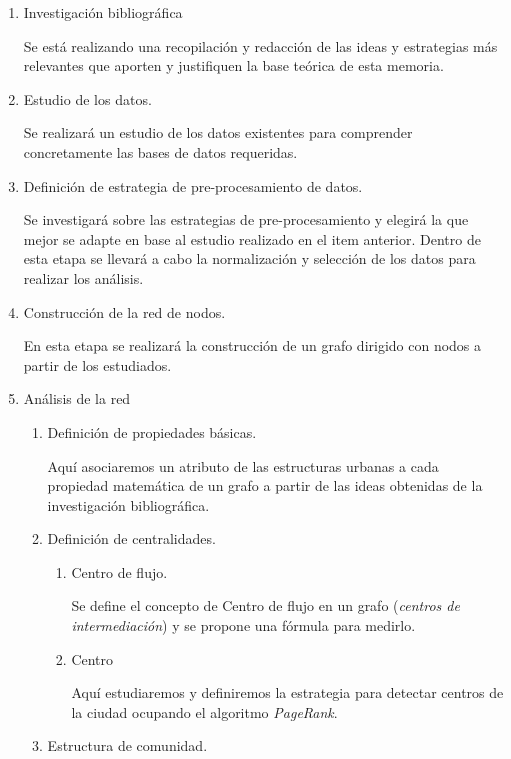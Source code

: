 \documentclass[12pt]{article}
\begin{document}
    \begin{enumerate}
    \item Investigación bibliográfica

    Se está realizando una recopilación y redacción de las ideas y estrategias más relevantes que aporten y justifiquen la base teórica de esta memoria.

    \item Estudio de los datos.

    Se realizará un estudio de los datos existentes para comprender concretamente las bases de datos requeridas.  

    \item Definición de estrategia de pre-procesamiento de datos.

    Se investigará sobre las estrategias de pre-procesamiento y elegirá la que mejor se adapte en base al estudio realizado en el item anterior. Dentro de esta etapa se llevará a cabo la normalización y selección de los datos para realizar los análisis.

    \item Construcción de la red de nodos.

    En esta etapa se realizará la construcción de un grafo dirigido con nodos a partir de los estudiados.

    \item Análisis de la red
    \begin{enumerate}
    \item Definición de propiedades básicas.

    Aquí asociaremos un atributo de las estructuras urbanas a cada propiedad matemática de un grafo a partir de las ideas obtenidas de la investigación bibliográfica.

    \item Definición de centralidades.
    \begin{enumerate}
    \item Centro de flujo.

    Se define el concepto de Centro de flujo en un grafo (\textit{centros de intermediación}) y se propone una fórmula para medirlo.

    \item Centro

    Aquí estudiaremos y definiremos la estrategia para detectar centros de la ciudad ocupando el algoritmo \textit{PageRank}.

    \end{enumerate}
    \item Estructura de comunidad.


\end{enumerate}
\end{enumerate}
\end{document}
